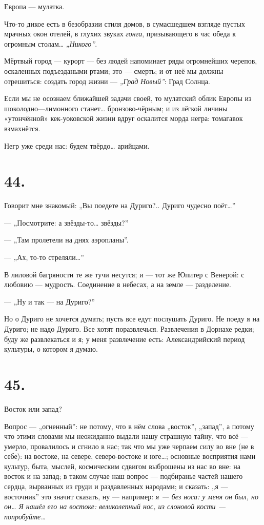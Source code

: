 \documentclass[12pt,a4paper,oneside]{book}
\begin{document}
Европа — мулатка.

Что-то дикое есть в безобразии стиля домов, в сумасшедшем взгляде пустых мрачных окон отелей, в глухих звуках \emph{гонга}, призывающего в час обеда к огромным столам… \emph{„Никого”}.

Мёртвый город — курорт — без людей напоминает ряды огромнейших черепов, оскаленных подъездаными ртами; это — смерть; и от неё мы должны отрешиться: создать город жизни — \emph{„Град Новый”}: Град Солнца.

Если мы не осознаем ближайшей задачи своей, то мулатский облик Европы из шоколодно—лимонного станет… бронзово-чёрным; и из лёгкой личины «утончённой» кек-уоковской жизни вдруг оскалится морда негра: томагавок взмахнётся.

Негр уже среди нас: будем твёрдо… арийцами.

\section*{44.}

Говорит мне знакомый: „Вы поедете на Дуриго?.. Дуриго чудесно поёт…”

— „Посмотрите: а звёзды-то… звёзды?”

— „Там пролетели на днях аэропланы”.

— „Ах, то-то стреляли…”

В лиловой багряности те же тучи несутся; и — тот же Юпитер с Венерой: с любовию — мудрость. Соединение в небесах, а на земле — разделение.

— „Ну и так — на Дуриго?”

Но о Дуриго не хочется думать; пусть все едут послушать Дуриго. Не поеду я на Дуриго; не надо Дуриго. Все хотят поразвлечься. Развлечения в Дорнахе редки; буду же развлекаться и я; у меня развлечение есть: Александрийский период культуры, о котором я думаю.

\section*{45.}

Восток или запад?

Вопрос — „огненный”: не потому, что в нём слова „восток”, „запад”, а потому что этими словами мы неожиданно выдали нашу страшную тайну, что всё — умерло, провалилось и сгнило в нас; так что мы уже черпаем силу во вне (не в себе): на востоке, на севере, северо-востоке и юге…; основные восприятия нами культур, быта, мыслей, космическим сдвигом выброшены из нас во вне: на восток и на запад; в таком случае наш вопрос — подбиранье частей нашего сердца, вырванных из груди и раздавленных народами; и сказать: „я — восточник” это значит сказать, ну — например: \emph{я — без носа: у меня он был, но он… Я нашёл его на востоке: великолепный нос, из слоновой кости — попробуйте…}
\end{document}
